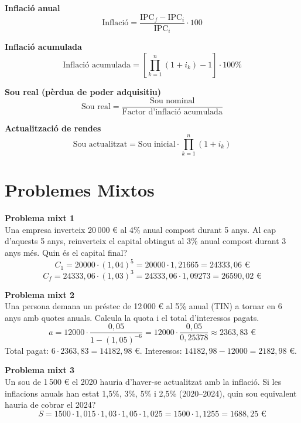 \documentclass[12pt]{article}
\begin{document}
\begin{resum}[title=Resum 7: IPC i Inflació]
\textbf{Inflació anual}
\[
\text{Inflació} = \dfrac{\text{IPC}_f - \text{IPC}_i}{\text{IPC}_i} \cdot 100
\]

\textbf{Inflació acumulada}
\[
\text{Inflació acumulada} = \left[\prod_{k=1}^{n}(1+i_k) - 1\right] \cdot 100\%
\]

\textbf{Sou real (pèrdua de poder adquisitiu)}
\[
\text{Sou real} = \dfrac{\text{Sou nominal}}{\text{Factor d'inflació acumulada}}
\]

\textbf{Actualització de rendes}
\[
\text{Sou actualitzat} = \text{Sou inicial} \cdot \prod_{k=1}^{n}(1+i_k)
\]
\end{resum}

\newpage

\section{Problemes Mixtos}

\begin{exemple}
\textbf{Problema mixt 1}\\
Una empresa inverteix 20\,000 € al 4\% anual compost durant 5 anys. Al cap d'aquests 5 anys, reinverteix el capital obtingut al 3\% anual compost durant 3 anys més. Quin és el capital final?
\[
C_1 = 20000 \cdot (1{,}04)^5 = 20000 \cdot 1{,}21665 = 24333{,}06 \text{ €}
\]
\[
C_f = 24333{,}06 \cdot (1{,}03)^3 = 24333{,}06 \cdot 1{,}09273 = 26590{,}02 \text{ €}
\]
\end{exemple}

\begin{exemple}
\textbf{Problema mixt 2}\\
Una persona demana un préstec de 12\,000 € al 5\% anual (TIN) a tornar en 6 anys amb quotes anuals. Calcula la quota i el total d'interessos pagats.
\[
a = 12000 \cdot \dfrac{0{,}05}{1-(1{,}05)^{-6}} = 12000 \cdot \dfrac{0{,}05}{0{,}25378} \approx 2363{,}83 \text{ €}
\]
Total pagat: $6 \cdot 2363{,}83 = 14182{,}98$ €. Interessos: $14182{,}98 - 12000 = 2182{,}98$ €.
\end{exemple}

\begin{exemple}
\textbf{Problema mixt 3}\\
Un sou de 1\,500 € el 2020 hauria d'haver-se actualitzat amb la inflació. Si les inflacions anuals han estat 1{,}5\%, 3\%, 5\% i 2{,}5\% (2020--2024), quin sou equivalent hauria de cobrar el 2024?
\[
S = 1500 \cdot 1{,}015 \cdot 1{,}03 \cdot 1{,}05 \cdot 1{,}025 = 1500 \cdot 1{,}1255 = 1688{,}25 \text{ €}
\]
\end{exemple}
\end{document}
